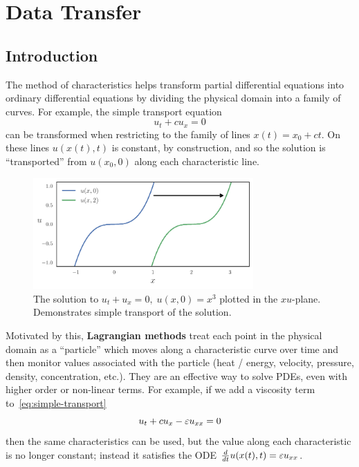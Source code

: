 \chapter{Data Transfer}\label{chap:data-transfer}

\section{Introduction}

The method of characteristics helps transform partial differential equations
into ordinary differential equations by dividing the physical domain into
a family of curves. For example, the simple transport equation
\begin{equation}\label{eq:simple-transport}
u_t + c u_x = 0
\end{equation}
can be transformed when restricting to the family of lines
\(x(t) = x_0 + c t\). On these lines \(u(x(t), t)\) is constant, by
construction, and so the solution is ``transported'' from \(u(x_0, 0)\)
along each characteristic line.

\begin{figure}[H]
  \includegraphics[width=0.75\textwidth]
                  {../images/curved-mesh/simple_transport.pdf}
  \centering
  \caption{The solution to \(u_t + u_x = 0, \; u(x, 0) = x^3\) plotted in
    the \(xu\)-plane. Demonstrates simple transport of
    the solution.}
  \label{fig:simple-transport}
\end{figure}

Motivated by this, \textbf{Lagrangian methods} treat each point in the
physical domain as a ``particle'' which moves along a characteristic curve
over time and then monitor values associated with the particle (heat / energy,
velocity, pressure, density, concentration, etc.). They are an effective way
to solve PDEs, even with higher order or non-linear terms.
For example, if we add a viscosity term to~\eqref{eq:simple-transport}
\begin{equation}
u_t + c u_x - \varepsilon u_{xx} = 0
\end{equation}
then the same characteristics can be used, but the value
along each characteristic is no longer constant; instead it satisfies the
ODE \(\frac{d}{dt} u(x(t), t) = \varepsilon u_{xx}\).

